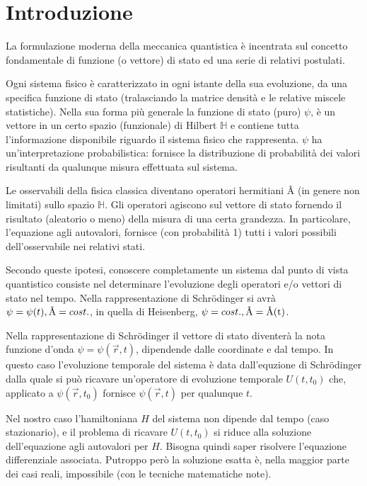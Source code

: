 \documentclass[a4paper, 10pt]{article}
\begin{document}
\section{Introduzione}
\begin{small}
La formulazione moderna della meccanica quantistica è incentrata sul concetto fondamentale di funzione (o vettore) di stato ed una serie di relativi postulati.

Ogni sistema fisico è caratterizzato in ogni istante della sua evoluzione, da una specifica funzione di stato (tralasciando la matrice densità e le relative miscele statistiche). Nella sua forma più generale la funzione di stato (puro) $\psi$, è un vettore in un certo spazio (funzionale) di Hilbert $\mathbb{H}$ e contiene tutta l'informazione disponibile riguardo il sistema fisico che rappresenta. $\psi$ ha un'interpretazione probabilistica: fornisce la distribuzione di probabilità dei valori risultanti da qualunque misura effettuata sul sistema.

Le osservabili della fisica classica diventano operatori hermitiani \^A (in genere non limitati) sullo spazio $\mathbb{H}$. Gli operatori agiscono sul vettore di stato fornendo il risultato (aleatorio o meno) della misura di una certa grandezza. In particolare, l'equazione agli autovalori, fornisce (con probabilità 1) tutti i valori possibili dell'osservabile nei relativi stati.

Secondo queste ipotesi, conoscere completamente un sistema dal punto di vista quantistico consiste nel determinare l'evoluzione degli operatori e/o vettori di stato nel tempo. Nella rappresentazione di Schr\"odinger si avrà $\psi = \psi(t), \textnormal{\^A} = cost.$, in quella di Heisenberg, $\psi = cost., \textnormal{\^A} = \textnormal{\^A(t)}$.

Nella rappresentazione di Schr\"odinger il vettore di stato diventerà la nota funzione d'onda $\psi = \psi(\vec{r} , t)$, dipendende dalle coordinate e dal tempo. In questo caso l'evoluzione temporale del sistema è data dall'equzione di Schr\"odinger dalla quale si può ricavare un'operatore di evoluzione temporale $U(t,t_0)$ che, applicato a $\psi(\vec{r}, t_0)$ fornisce $\psi(\vec{r}, t)$ per qualunque $t$.

Nel nostro caso l'hamiltoniana $H$ del sistema non dipende dal tempo (caso stazionario), e il problema di ricavare $U(t, t_0)$ si riduce alla soluzione dell'equazione agli autovalori per $H$. Bisogna quindi saper risolvere l'equazione differenziale associata. Putroppo però la soluzione esatta è, nella maggior parte dei casi reali, impossibile (con le tecniche matematiche note).


\end{small}
\end{document}
